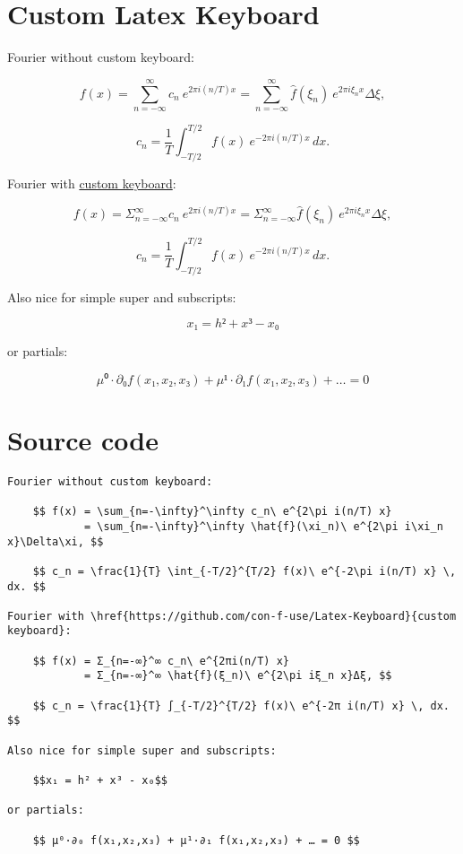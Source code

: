 \documentclass[a4paper]{article}
\begin{document}
\section{Custom Latex Keyboard}

Fourier without custom keyboard:

    $$ f(x)=\sum_{n=-\infty}^\infty c_n\ e^{2\pi i(n/T) x} =\sum_{n=-\infty}^\infty \hat{f}(\xi_n)\ e^{2\pi i\xi_n x}\Delta\xi, $$
    
    $$ c_n = \frac{1}{T} \int_{-T/2}^{T/2} f(x)\ e^{-2\pi i(n/T) x} \, dx. $$
   
Fourier with \href{https://github.com/con-f-use/Latex-Keyboard}{custom keyboard}:

    $$ f(x)= Σ_{n=-∞}^∞ c_n\ e^{2πi(n/T) x} =Σ_{n=-∞}^∞ \hat{f}(ξ_n)\ e^{2\pi iξ_n x}Δξ, $$
    
    $$ c_n = \frac{1}{T} ∫_{-T/2}^{T/2} f(x)\ e^{-2π i(n/T) x} \, dx. $$
    
Also nice for simple super and subscripts: 

    $$x₁ = h² + x³ - x₀$$
    
or partials: 

    $$ μ⁰·∂₀ f(x₁,x₂,x₃) + μ¹·∂₁ f(x₁,x₂,x₃) + … = 0 $$
    
\section{Source code}

\begin{Verbatim}[fontsize=\small, frame=single]
Fourier without custom keyboard:

    $$ f(x) = \sum_{n=-\infty}^\infty c_n\ e^{2\pi i(n/T) x} 
            = \sum_{n=-\infty}^\infty \hat{f}(\xi_n)\ e^{2\pi i\xi_n x}\Delta\xi, $$
    
    $$ c_n = \frac{1}{T} \int_{-T/2}^{T/2} f(x)\ e^{-2\pi i(n/T) x} \, dx. $$
   
Fourier with \href{https://github.com/con-f-use/Latex-Keyboard}{custom keyboard}:

    $$ f(x) = Σ_{n=-∞}^∞ c_n\ e^{2πi(n/T) x} 
            = Σ_{n=-∞}^∞ \hat{f}(ξ_n)\ e^{2\pi iξ_n x}Δξ, $$
    
    $$ c_n = \frac{1}{T} ∫_{-T/2}^{T/2} f(x)\ e^{-2π i(n/T) x} \, dx. $$
    
Also nice for simple super and subscripts: 

    $$x₁ = h² + x³ - x₀$$
    
or partials: 

    $$ μ⁰·∂₀ f(x₁,x₂,x₃) + μ¹·∂₁ f(x₁,x₂,x₃) + … = 0 $$
\end{Verbatim}
 
\end{document}
